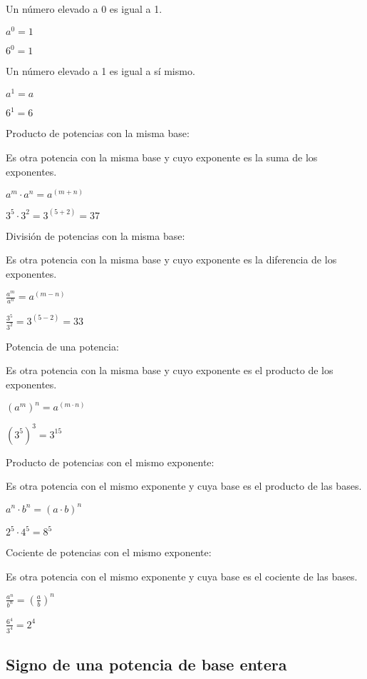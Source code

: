 \documentclass{article}
\begin{document}
\bigskip

Un n\'umero elevado a 0 es igual a 1.

 $a^{0}=1$

 $6^{0}=1$

Un n\'umero elevado a 1 es igual a s\'i mismo.

 $a^{1}=a$

 $6^{1}=6$

Producto de potencias con la misma base:

Es otra potencia con la misma base y cuyo exponente es la suma de los exponentes.

 $a^{m}\cdot a^{n}=a^{(m+n)}$

 $3^{5}\cdot 3^{2}=3^{(5+2)}=37$

Divisi\'on de potencias con la misma base:

Es otra potencia con la misma base y cuyo exponente es la diferencia de los exponentes.

 $\frac{a^{m}}{a^{n}}=a^{(m-n)}$

 $\frac{3^{5}}{3^{2}}=3^{(5-2)}=33$


\bigskip

Potencia de una potencia:

Es otra potencia con la misma base y cuyo exponente es el producto de los exponentes.

 ${(a^{m})}^{n}=a^{(m\cdot n)}$

 ${(3^{5})}^{3}=3^{15}$


\bigskip

Producto de potencias con el mismo exponente:

Es otra potencia con el mismo exponente y cuya base es el producto de las bases.

 $a^{n}\cdot b^{n}={(a\cdot b)}^{n}$

 $2^{5}\cdot 4^{5}=8^{5}$

Cociente de potencias con el mismo exponente:

Es otra potencia con el mismo exponente y cuya base es el cociente de las bases.

 $\frac{a^{n}}{b^{n}}={(\frac{a}{b})}^{n}$

 $\frac{6^{4}}{3^{4}}=2^{4}$

\subsection[Signo de una potencia de base entera]{Signo de una potencia de base entera}

\bigskip
\end{document}
